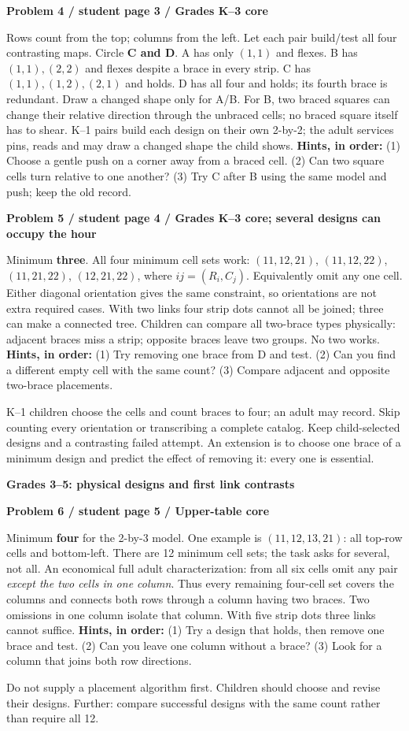 \documentclass[letterpaper,11pt]{article}
\newcommand{\titleline}[1]{\par{\large\bfseries #1}\par}
\newcommand{\sub}[1]{\par\textbf{#1}\par}
\newcommand{\task}[3]{\sub{Problem #1 / student page #2 / #3}}
\newcommand{\hints}[3]{\textbf{Hints, in order:} (1) #1 (2) #2 (3) #3\par}
\begin{document}
\task{4}{3}{Grades K--3 core}
Rows count from the top; columns from the left. Let each pair build/test all four contrasting maps. Circle \textbf{C and D}. A has only $(1,1)$ and flexes. B has $(1,1),(2,2)$ and flexes despite a brace in every strip. C has $(1,1),(1,2),(2,1)$ and holds. D has all four and holds; its fourth brace is redundant. Draw a changed shape only for A/B. For B, two braced squares can change their relative direction through the unbraced cells; no braced square itself has to shear. K--1 pairs build each design on their own 2-by-2; the adult services pins, reads and may draw a changed shape the child shows.
\hints{Choose a gentle push on a corner away from a braced cell.}{Can two square cells turn relative to one another?}{Try C after B using the same model and push; keep the old record.}

\task{5}{4}{Grades K--3 core; several designs can occupy the hour}
Minimum \textbf{three}. All four minimum cell sets work: $(11,12,21)$, $(11,12,22)$, $(11,21,22)$, $(12,21,22)$, where $ij=(R_i,C_j)$. Equivalently omit any one cell. Either diagonal orientation gives the same constraint, so orientations are not extra required cases. With two links four strip dots cannot all be joined; three can make a connected tree. Children can compare all two-brace types physically: adjacent braces miss a strip; opposite braces leave two groups. No two works.
\hints{Try removing one brace from D and test.}{Can you find a different empty cell with the same count?}{Compare adjacent and opposite two-brace placements.}
K--1 children choose the cells and count braces to four; an adult may record. Skip counting every orientation or transcribing a complete catalog. Keep child-selected designs and a contrasting failed attempt. An extension is to choose one brace of a minimum design and predict the effect of removing it: every one is essential.

\newpage
\titleline{Grades 3--5: physical designs and first link contrasts}
\task{6}{5}{Upper-table core}
Minimum \textbf{four} for the 2-by-3 model. One example is $(11,12,13,21)$: all top-row cells and bottom-left. There are 12 minimum cell sets; the task asks for several, not all. An economical full adult characterization: from all six cells omit any pair \emph{except the two cells in one column}. Thus every remaining four-cell set covers the columns and connects both rows through a column having two braces. Two omissions in one column isolate that column. With five strip dots three links cannot suffice.
\hints{Try a design that holds, then remove one brace and test.}{Can you leave one column without a brace?}{Look for a column that joins both row directions.}
Do not supply a placement algorithm first. Children should choose and revise their designs. Further: compare successful designs with the same count rather than require all 12.
\end{document}
